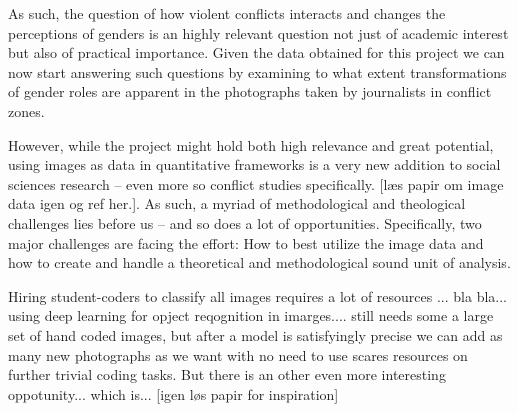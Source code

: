 \documentclass[a4paper]{article}
\begin{document}
As such, the question of how violent conflicts interacts and changes the perceptions of genders is an highly relevant question not just of academic interest but also of practical importance. Given the data obtained for this project we can now start answering such questions by examining to what extent transformations of gender roles are apparent in the photographs taken by journalists in conflict zones.\par


However, while the project might hold both high relevance and great potential, using images as data in quantitative frameworks is a very new addition to social sciences research -- even more so conflict studies specifically. [læs papir om image data igen og ref her.]. As such, a myriad of methodological and theological challenges lies before us -- and so does a lot of opportunities. Specifically, two major challenges are facing the effort: How to best utilize the image data and how to create and handle a theoretical and methodological sound unit of analysis.\par\par


Hiring student-coders to classify all images requires a lot of resources ... bla bla... using deep learning for opject reqognition in imarges.... still needs some a large set of hand coded images, but after a model is satisfyingly precise we can add as many new photographs as we want with no need to use scares resources on further trivial coding tasks. But there is an other even more interesting oppotunity... which is... [igen løs papir for inspiration]
\end{document}

